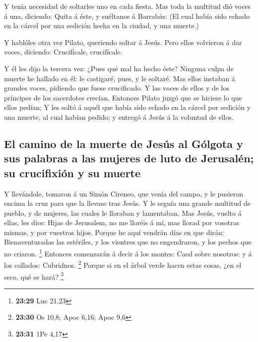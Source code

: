  Y tenía necesidad de soltarles uno en cada fiesta.
 Mas toda la multitud dió voces á una, diciendo: Quita á
éste, y suéltanos á Barrabás:  (El cual había sido echado
en la cárcel por una sedición hecha en la ciudad, y una muerte.)

 Y hablóles otra vez Pilato, queriendo soltar á Jesús.
 Pero ellos volvieron á dar voces, diciendo: Crucifícale,
crucifícale.

 Y él les dijo la tercera vez: ¿Pues qué mal ha hecho éste?
Ninguna culpa de muerte he hallado en él: le castigaré, pues, y le
soltaré.  Mas ellos instaban á grandes voces, pidiendo que
fuese crucificado. Y las voces de ellos y de los príncipes de los
sacerdotes crecían.  Entonces Pilato juzgó que se hiciese
lo que ellos pedían;  Y les soltó á aquél que había sido
echado en la cárcel por sedición y una muerte, al cual habían pedido; y
entregó á Jesús á la voluntad de ellos.

\hypertarget{el-camino-de-la-muerte-de-jesuxfas-al-guxf3lgota-y-sus-palabras-a-las-mujeres-de-luto-de-jerusaluxe9n-su-crucifixiuxf3n-y-su-muerte}{%
\subsection{El camino de la muerte de Jesús al Gólgota y sus palabras a
las mujeres de luto de Jerusalén; su crucifixión y su
muerte}\label{el-camino-de-la-muerte-de-jesuxfas-al-guxf3lgota-y-sus-palabras-a-las-mujeres-de-luto-de-jerusaluxe9n-su-crucifixiuxf3n-y-su-muerte}}

 Y llevándole, tomaron á un Simón Cireneo, que venía del
campo, y le pusieron encima la cruz para que la llevase tras Jesús.
 Y le seguía una grande multitud de pueblo, y de mujeres,
las cuales le lloraban y lamentaban.  Mas Jesús, vuelto á
ellas, les dice: Hijas de Jerusalem, no me lloréis á mí, mas llorad por
vosotras mismas, y por vuestros hijos.  Porque he aquí
vendrán días en que dirán: Bienaventuradas las estériles, y los vientres
que no engendraron, y los pechos que no criaron. \footnote{\textbf{23:29}
  Luc 21,23}  Entonces comenzarán á decir á los montes:
Caed sobre nosotros: y á los collados: Cubridnos. \footnote{\textbf{23:30}
  Os 10,8; Apoc 6,16; Apoc 9,6}  Porque si en el árbol
verde hacen estas cosas, ¿en el seco, qué se hará? \footnote{\textbf{23:31}
  1Pe 4,17}

